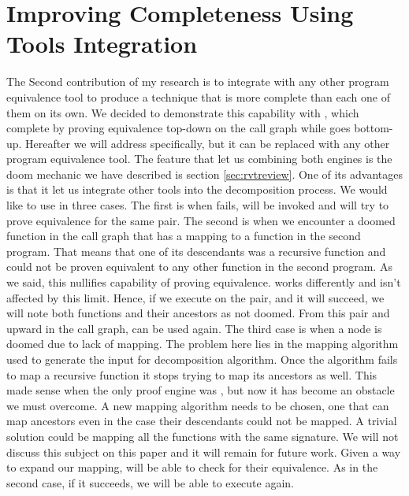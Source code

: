 \section{Improving Completeness Using Tools Integration}
The Second contribution of my research is to integrate  with any other program equivalence tool to produce a technique that is more complete than each one of them on its own. We decided to demonstrate this capability with  \cite{FelsingGrebingKlebanov2014}, which complete  by proving equivalence top-down on the call graph while  goes bottom-up. Hereafter we will address  specifically, but it can be replaced with any other program equivalence tool. The feature that let us combining both engines is the doom mechanic we have described is section \ref{sec:rvtreview}. One of its advantages is that it let us integrate other tools into the decomposition process. We would like to use  in three cases. The first is when  fails,  will be invoked and will try to prove equivalence for the same pair. The second is when we encounter a doomed function in the call graph that has a mapping to a function in the second program. That means that one of its descendants was a recursive function and could not be proven equivalent to any other function in the second program. As we said, this nullifies  capability of proving equivalence.  works differently and isn't affected by this limit. Hence, if we execute  on the pair, and it will succeed, we will note both functions and their ancestors as not doomed. From this pair and upward in the call graph,  can be used again. The third case is when a node is doomed due to lack of mapping. The problem here lies in the mapping algorithm used to generate the input for  decomposition algorithm. Once the algorithm fails to map a recursive function it stops trying to map its ancestors as well. This made sense when the only proof engine was , but now it has become an obstacle we must overcome. A new mapping algorithm needs to be chosen, one that can map ancestors even in the case their descendants could not be mapped. A trivial solution could be mapping all the functions with the same signature. We will not discuss this subject on this paper and it will remain for future work. Given a way to expand our mapping,  will be able to check for their equivalence. As in the second case, if it succeeds, we will be able to execute  again. 

